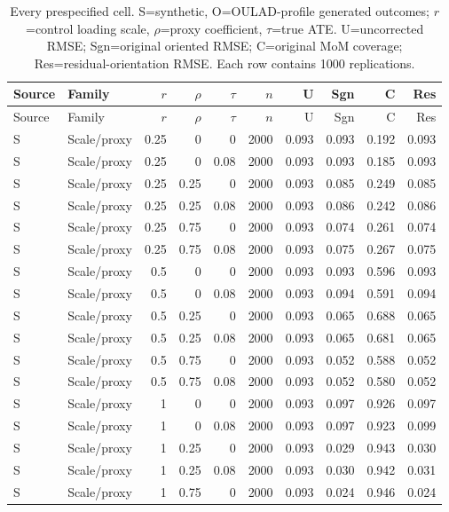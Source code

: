 \begin{longtable}{lp{2.5cm}rrrrrrrr}
\caption{Every prespecified cell. S=synthetic, O=OULAD-profile generated outcomes; $r$=control loading scale, $\rho$=proxy coefficient, $\tau$=true ATE. U=uncorrected RMSE; Sgn=original oriented RMSE; C=original MoM coverage; Res=residual-orientation RMSE. Each row contains 1000 replications.}\label{tab:all}\\
\hline Source & Family & $r$ & $\rho$ & $\tau$ & $n$ & U & Sgn & C & Res\\\hline
\endfirsthead
\hline Source & Family & $r$ & $\rho$ & $\tau$ & $n$ & U & Sgn & C & Res\\\hline
\endhead
\hline\endfoot
S & Scale/proxy & 0.25 & 0 & 0 & 2000 & 0.093 & 0.093 & 0.192 & 0.093 \\
S & Scale/proxy & 0.25 & 0 & 0.08 & 2000 & 0.093 & 0.093 & 0.185 & 0.093 \\
S & Scale/proxy & 0.25 & 0.25 & 0 & 2000 & 0.093 & 0.085 & 0.249 & 0.085 \\
S & Scale/proxy & 0.25 & 0.25 & 0.08 & 2000 & 0.093 & 0.086 & 0.242 & 0.086 \\
S & Scale/proxy & 0.25 & 0.75 & 0 & 2000 & 0.093 & 0.074 & 0.261 & 0.074 \\
S & Scale/proxy & 0.25 & 0.75 & 0.08 & 2000 & 0.093 & 0.075 & 0.267 & 0.075 \\
S & Scale/proxy & 0.5 & 0 & 0 & 2000 & 0.093 & 0.093 & 0.596 & 0.093 \\
S & Scale/proxy & 0.5 & 0 & 0.08 & 2000 & 0.093 & 0.094 & 0.591 & 0.094 \\
S & Scale/proxy & 0.5 & 0.25 & 0 & 2000 & 0.093 & 0.065 & 0.688 & 0.065 \\
S & Scale/proxy & 0.5 & 0.25 & 0.08 & 2000 & 0.093 & 0.065 & 0.681 & 0.065 \\
S & Scale/proxy & 0.5 & 0.75 & 0 & 2000 & 0.093 & 0.052 & 0.588 & 0.052 \\
S & Scale/proxy & 0.5 & 0.75 & 0.08 & 2000 & 0.093 & 0.052 & 0.580 & 0.052 \\
S & Scale/proxy & 1 & 0 & 0 & 2000 & 0.093 & 0.097 & 0.926 & 0.097 \\
S & Scale/proxy & 1 & 0 & 0.08 & 2000 & 0.093 & 0.097 & 0.923 & 0.099 \\
S & Scale/proxy & 1 & 0.25 & 0 & 2000 & 0.093 & 0.029 & 0.943 & 0.030 \\
S & Scale/proxy & 1 & 0.25 & 0.08 & 2000 & 0.093 & 0.030 & 0.942 & 0.031 \\
S & Scale/proxy & 1 & 0.75 & 0 & 2000 & 0.093 & 0.024 & 0.946 & 0.024 \\

\end{longtable}
